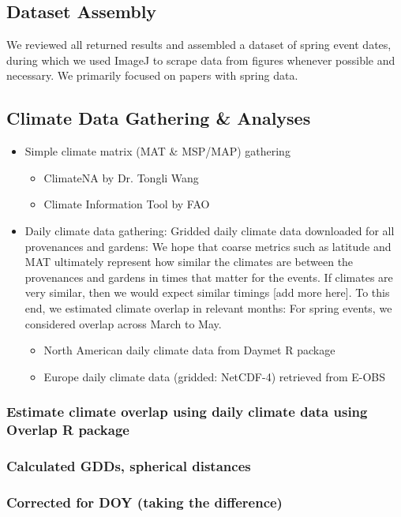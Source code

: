 \documentclass{article}
\begin{document}
\subsection{Dataset Assembly}
We reviewed all returned results and assembled a dataset of spring event dates, during which we used ImageJ to scrape data from figures whenever possible and necessary.
We primarily focused on papers with spring data. 

\subsection{Climate Data Gathering \& Analyses}
  \begin{itemize}
  \item Simple climate matrix (MAT \& MSP/MAP) gathering
  \begin{itemize}
  \item ClimateNA by Dr. Tongli Wang
  \item Climate Information Tool by FAO
  \end{itemize}
  \item Daily climate data gathering: Gridded daily climate data downloaded for all provenances and gardens: We hope that coarse metrics such as latitude and MAT ultimately represent how similar the climates are between the provenances and gardens in times that matter for the events. If climates are very similar, then we would expect similar timings [add more here].
To this end, we estimated climate overlap in relevant months: For spring events, we considered overlap across March to May.
  \begin{itemize}
  \item North American daily climate data from Daymet R package
  \item Europe daily climate data (gridded: NetCDF-4) retrieved from E-OBS 
  \end{itemize}
  \end{itemize}

\subsubsection{Estimate climate overlap using daily climate data using Overlap R package}
\subsubsection{Calculated GDDs, spherical distances}
\subsubsection{Corrected for DOY (taking the difference)}
\end{document}
